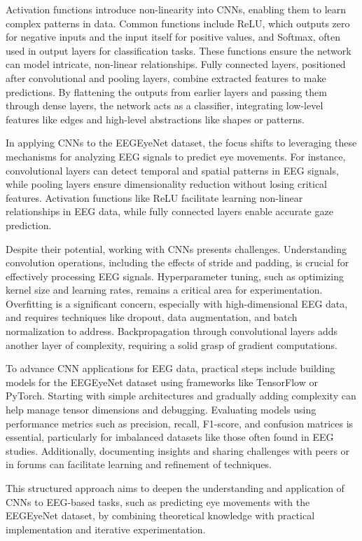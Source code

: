 \documentclass{article}
\begin{document}
Activation functions introduce non-linearity into CNNs, enabling them to learn complex patterns in data. Common functions include ReLU, which outputs zero for negative inputs and the input itself for positive values, and Softmax, often used in output layers for classification tasks. These functions ensure the network can model intricate, non-linear relationships. Fully connected layers, positioned after convolutional and pooling layers, combine extracted features to make predictions. By flattening the outputs from earlier layers and passing them through dense layers, the network acts as a classifier, integrating low-level features like edges and high-level abstractions like shapes or patterns.

In applying CNNs to the EEGEyeNet dataset, the focus shifts to leveraging these mechanisms for analyzing EEG signals to predict eye movements. For instance, convolutional layers can detect temporal and spatial patterns in EEG signals, while pooling layers ensure dimensionality reduction without losing critical features. Activation functions like ReLU facilitate learning non-linear relationships in EEG data, while fully connected layers enable accurate gaze prediction.

Despite their potential, working with CNNs presents challenges. Understanding convolution operations, including the effects of stride and padding, is crucial for effectively processing EEG signals. Hyperparameter tuning, such as optimizing kernel size and learning rates, remains a critical area for experimentation. Overfitting is a significant concern, especially with high-dimensional EEG data, and requires techniques like dropout, data augmentation, and batch normalization to address. Backpropagation through convolutional layers adds another layer of complexity, requiring a solid grasp of gradient computations.

To advance CNN applications for EEG data, practical steps include building models for the EEGEyeNet dataset using frameworks like TensorFlow or PyTorch. Starting with simple architectures and gradually adding complexity can help manage tensor dimensions and debugging. Evaluating models using performance metrics such as precision, recall, F1-score, and confusion matrices is essential, particularly for imbalanced datasets like those often found in EEG studies. Additionally, documenting insights and sharing challenges with peers or in forums can facilitate learning and refinement of techniques.

This structured approach aims to deepen the understanding and application of CNNs to EEG-based tasks, such as predicting eye movements with the EEGEyeNet dataset, by combining theoretical knowledge with practical implementation and iterative experimentation.
\end{document}
